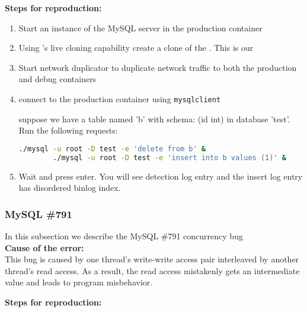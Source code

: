 \noindent \textbf{Steps for reproduction:} \\

\begin{adjustwidth}{0.5cm}{}
	\begin{enumerate}
		\item Start an instance of the MySQL server in the production container
		\item Using \parikshan's live cloning capability create a clone of the \productioncontainer. This is our \debugcontainer
		\item Start network duplicator to duplicate network traffic to both the production and debug containers
		\item connect to the production container using \texttt{mysqlclient}
		
		suppose we have a table named 'b' with schema: (id int) in database 'test'.
		Run the following requests:
		
		\begin{lstlisting}[language=sh]
		./mysql -u root -D test -e 'delete from b' &
		./mysql -u root -D test -e 'insert into b values (1)' &
		\end{lstlisting}
		
		\item Wait and press enter. You will see detection log entry and the insert log entry has disordered binlog index.
		
	\end{enumerate}
\end{adjustwidth}	


\subsubsection{MySQL \#791}

In this subsection we describe the MySQL \#791 concurrency bug \\

\noindent \textbf{Cause of the error:} \\

This bug is caused by one thread's write-write access pair interleaved by another thread's read access. As a result, the read access mistakenly gets an intermediate value and leads to program misbehavior.

\noindent \textbf{Steps for reproduction:} \\

